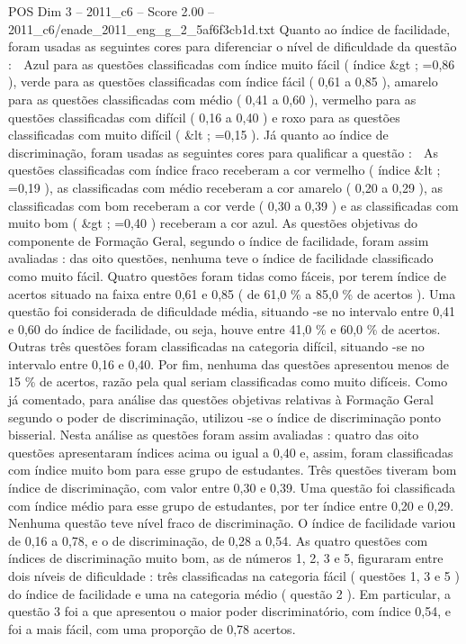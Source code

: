 \begin{textsample}{POS Dim 3 – 2011\_c6 – Score 2.00 – 2011\_c6/enade\_2011\_eng\_g\_2\_5af6f3cb1d.txt}
Quanto ao índice de facilidade, foram usadas as seguintes cores para diferenciar o nível de dificuldade da questão :  Azul para as questões classificadas com índice muito fácil ( índice \&gt ; =0,86 ), verde para as questões classificadas com índice fácil ( 0,61 a 0,85 ), amarelo para as questões classificadas com médio ( 0,41 a 0,60 ), vermelho para as questões classificadas com difícil ( 0,16 a 0,40 ) e roxo para as questões classificadas com muito difícil ( \&lt ; =0,15 ).
Já quanto ao índice de discriminação, foram usadas as seguintes cores para qualificar a questão :  As questões classificadas com índice fraco receberam a cor vermelho ( índice \&lt ; =0,19 ), as classificadas com médio receberam a cor amarelo ( 0,20 a 0,29 ), as classificadas com bom receberam a cor verde ( 0,30 a 0,39 ) e as classificadas com muito bom ( \&gt ; =0,40 ) receberam a cor azul.
As questões objetivas do componente de Formação Geral, segundo o índice de facilidade, foram assim avaliadas : das oito questões, nenhuma teve o índice de facilidade classificado como muito fácil.
Quatro questões foram tidas como fáceis, por terem índice de acertos situado na faixa entre 0,61 e 0,85 ( de 61,0 \% a 85,0 \% de acertos ).
Uma questão foi considerada de dificuldade média, situando -se no intervalo entre 0,41 e 0,60 do índice de facilidade, ou seja, houve entre 41,0 \% e 60,0 \% de acertos.
Outras três questões foram classificadas na categoria difícil, situando -se no intervalo entre 0,16 e 0,40.
Por fim, nenhuma das questões apresentou menos de 15 \% de acertos, razão pela qual seriam classificadas como muito difíceis.
Como já comentado, para análise das questões objetivas relativas à Formação Geral segundo o poder de discriminação, utilizou -se o índice de discriminação ponto bisserial.
Nesta análise as questões foram assim avaliadas : quatro das oito questões apresentaram índices acima ou igual a 0,40 e, assim, foram classificadas com índice muito bom para esse grupo de estudantes.
Três questões tiveram bom índice de discriminação, com valor entre 0,30 e 0,39.
Uma questão foi classificada com índice médio para esse grupo de estudantes, por ter índice entre 0,20 e 0,29.
Nenhuma questão teve nível fraco de discriminação.
O índice de facilidade variou de 0,16 a 0,78, e o de discriminação, de 0,28 a 0,54.
As quatro questões com índices de discriminação muito bom, as de números 1, 2, 3 e 5, figuraram entre dois níveis de dificuldade : três classificadas na categoria fácil ( questões 1, 3 e 5 ) do índice de facilidade e uma na categoria médio ( questão 2 ).
Em particular, a questão 3 foi a que apresentou o maior poder discriminatório, com índice 0,54, e foi a mais fácil, com uma proporção de 0,78 acertos.

\end{textsample}
